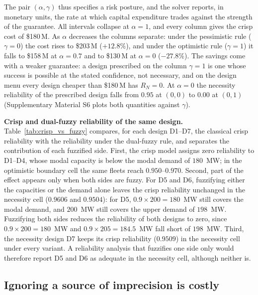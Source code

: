 \documentclass[Review,sagev,times]{sagej}%
\begin{document}
The pair $(\alpha,\gamma)$ thus specifies a risk posture, and the solver reports, in monetary units, the
rate at which capital expenditure trades against the strength of the guarantee. All intervals collapse at
$\alpha=1$, and every column gives the crisp cost of \$180\,M. As $\alpha$ decreases the columns separate:
under the pessimistic rule ($\gamma=0$) the cost rises to \$203\,M ($+12.8\%$), and under the optimistic rule
($\gamma=1$) it falls to \$158\,M at $\alpha=0.7$ and to \$130\,M at $\alpha=0$ ($-27.8\%$). The savings come
with a weaker guarantee: a design prescribed on the column $\gamma=1$ is one whose success is possible at the
stated confidence, not necessary, and on the design menu every design cheaper than \$180\,M has $R_N = 0$. At
$\alpha=0$ the necessity reliability of the prescribed design falls from $0.95$ at $(0,0)$ to $0.00$ at $(0,1)$
(Supplementary Material S6 plots both quantities against $\gamma$).

\textbf{Crisp and dual-fuzzy reliability of the same design.} Table~\ref{tab:crisp_vs_fuzzy} compares, for each
design D1--D7, the classical crisp reliability with the reliability under the dual-fuzzy rule, and separates
the contribution of each fuzzified side. First, the crisp model assigns zero reliability to D1--D4, whose modal
capacity is below the modal demand of $180$~MW; in the optimistic boundary cell the same fleets reach
$0.950$--$0.970$. Second, part of the effect appears only when both sides are fuzzy. For D5 and D6, fuzzifying
either the capacities or the demand alone leaves the crisp reliability unchanged in the necessity cell
($0.9606$ and $0.9504$): for D5, $0.9 \times 200 = 180$~MW still covers the modal demand, and $200$~MW still
covers the upper demand of $198$~MW. Fuzzifying both sides reduces the reliability of both designs to zero,
since $0.9 \times 200 = 180$~MW and $0.9 \times 205 = 184.5$~MW fall short of $198$~MW. Third, the necessity
design D7 keeps its crisp reliability ($0.9509$) in the necessity cell under every variant. A reliability
analysis that fuzzifies one side only would therefore report D5 and D6 as adequate in the necessity cell,
although neither is.



\subsection{Ignoring a source of imprecision is costly} \label{sec:baselines_res}


\end{document}
